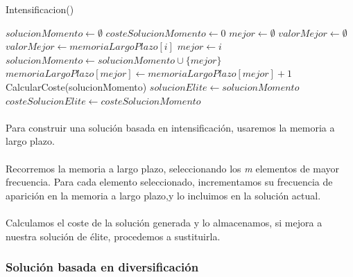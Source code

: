 \documentclass{article}
\begin{document}
		\begin{algorithm}[H]
			\caption{Intensificacion()}
			\begin{algorithmic}
				\STATE $solucionMomento \leftarrow \emptyset$
				\STATE $costeSolucionMomento \leftarrow 0$
				\STATE $mejor \leftarrow \emptyset$
				\STATE $valorMejor \leftarrow \emptyset$
				\STATE $valorMejor \leftarrow memoriaLargoPlazo[i]$
				\STATE $mejor \leftarrow i$
				\ENDIF
				\ENDFOR
				\STATE $solucionMomento \leftarrow solucionMomento \cup \{mejor\}$
				\STATE $memoriaLargoPlazo[mejor] \leftarrow memoriaLargoPlazo[mejor]+1$
				\ENDWHILE
				\STATE CalcularCoste(solucionMomento)
				\STATE $solucionElite \leftarrow solucionMomento$
				\STATE $costeSolucionElite \leftarrow costeSolucionMomento$
				\ENDIF
			\end{algorithmic}
		\end{algorithm}
	
		\paragraph{}Para construir una solución basada en intensificación, usaremos la memoria a largo plazo.
		
		\paragraph{}Recorremos la memoria a largo plazo, seleccionando los \emph{m} elementos de mayor frecuencia. Para cada elemento seleccionado, incrementamos su frecuencia de aparición en la memoria a largo plazo,y lo incluimos en la solución actual.
		
		\paragraph{}Calculamos el coste de la solución generada y lo almacenamos, si mejora a nuestra solución de élite, procedemos a sustituirla. 
		
		\subsubsection{Solución basada en diversificación}
		
\end{document}

